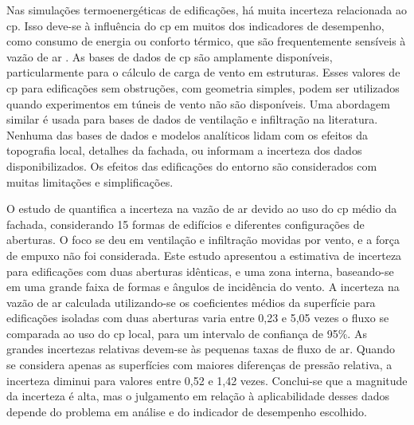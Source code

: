 Nas simulações termoenergéticas de edificações, há muita incerteza relacionada ao \acrshort{cp}. Isso deve-se à influência do \acrshort{cp} em muitos dos indicadores de desempenho, como consumo de energia ou conforto térmico, que são frequentemente sensíveis à vazão de ar \cite{Costola2009}. 
As bases de dados de \acrshort{cp} são amplamente disponíveis, particularmente para o cálculo de carga de vento em estruturas. Esses valores de \acrshort{cp} para edificações sem obstruções, com geometria simples, podem ser utilizados quando experimentos em túneis de vento não são disponíveis. Uma abordagem similar é usada para bases de dados de ventilação e infiltração na literatura. Nenhuma das bases de dados e modelos analíticos lidam com os efeitos da topografia local, detalhes da fachada, ou informam a incerteza dos dados disponibilizados. Os efeitos das edificações do entorno são considerados com muitas limitações e simplificações.

O estudo de  quantifica a incerteza na vazão de ar devido ao uso do \acrshort{cp} médio da fachada, considerando 15 formas de edifícios e diferentes configurações de aberturas. O foco se deu em ventilação e infiltração movidas por vento, e a força de empuxo não foi considerada. Este estudo apresentou a estimativa de incerteza para edificações com duas aberturas idênticas, e uma zona interna, baseando-se em uma grande faixa de formas e ângulos de incidência do vento. A incerteza na vazão de ar calculada utilizando-se os coeficientes médios da superfície para edificações isoladas com duas aberturas varia entre 0,23 e 5,05 vezes o fluxo se comparada ao uso do \acrshort{cp} local, para um intervalo de confiança de 95\%. As grandes incertezas relativas devem-se às pequenas taxas de fluxo de ar. Quando se considera apenas as superfícies com maiores diferenças de pressão relativa, a incerteza diminui para  valores entre 0,52 e 1,42 vezes. Conclui-se que a magnitude da incerteza é alta, mas o julgamento em relação à aplicabilidade desses dados depende do problema em análise e do indicador de desempenho escolhido.

